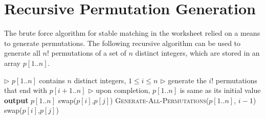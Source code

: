 \documentclass[11pt]{article}
\begin{document}
\newpage
\section{Recursive Permutation Generation}
The brute force algorithm for stable matching in the worksheet relied on a means to generate permutations.
The following recursive algorithm can be used to generate all $n!$
permutations of a set of $n$ distinct integers, which are stored in an array $p[1..n]$.

\vspace{.1in}

\begin{algorithmic}[1]
\State $\triangleright$ $p[1..n]$ contains $n$ distinct integers, $1 \le i \le n$
\State $\triangleright$ generate the $i!$ permutations that end with $p[i+1..n]$
\State $\triangleright$ upon completion, $p[1..n]$ is same as its initial value
\State \textbf{output} $p[1..n]$
\Else
      \State swap($p[i]$,$p[j]$)
      \State \textsc{Generate-All-Permutations}($p[1..n]$, $i-1$)
      \State swap($p[i]$,$p[j]$)
   \EndFor
\EndIf
\EndFunction
\end{algorithmic}
\end{document}
